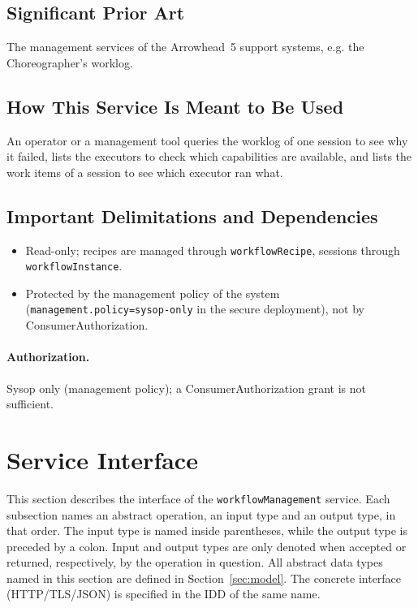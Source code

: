 \documentclass[a4paper]{arrowhead}
\begin{document}
\subsection{Significant Prior Art}
The management services of the Arrowhead~5 support systems, e.g. the Choreographer's worklog.

\subsection{How This Service Is Meant to Be Used}
An operator or a management tool queries the worklog of one session to see why it failed, lists the
executors to check which capabilities are available, and lists the work items of a session to see which executor ran
what.

\subsection{Important Delimitations and Dependencies}
\label{sec:delimitations}
\begin{itemize}
\item Read-only; recipes are managed through \texttt{workflow\allowbreak{}Recipe}, sessions through \texttt{workflow\allowbreak{}Instance}.
\item Protected by the management policy of the system (\texttt{management.\allowbreak{}policy=\allowbreak{}sysop-\allowbreak{}only} in the secure deployment), not by ConsumerAuthorization.
\end{itemize}

\paragraph{Authorization.} Sysop only (management policy); a ConsumerAuthorization grant is not sufficient.

\newpage
\section{Service Interface}
\label{sec:operations}
This section describes the interface of the \texttt{workflow\allowbreak{}Management} service. Each subsection names an abstract operation,
an input type and an output type, in that order. The input type is named inside parentheses, while the output type is
preceded by a colon. Input and output types are only denoted when accepted or returned, respectively, by the operation
in question. All abstract data types named in this section are defined in Section~\ref{sec:model}. The concrete
interface (HTTP/TLS/JSON) is specified in the IDD of the same name.
\end{document}
